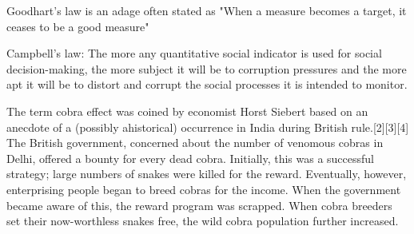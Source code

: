 Goodhart's law is an adage often stated as "When a measure becomes a target, it ceases to be a good measure"

Campbell's law:
The more any quantitative social indicator is used for social decision-making, the more subject it will be to corruption pressures and the more apt it will be to distort and corrupt the social processes it is intended to monitor.

The term cobra effect was coined by economist Horst Siebert based on an anecdote of a (possibly ahistorical) occurrence in India during British rule.[2][3][4] The British government, concerned about the number of venomous cobras in Delhi, offered a bounty for every dead cobra. Initially, this was a successful strategy; large numbers of snakes were killed for the reward. Eventually, however, enterprising people began to breed cobras for the income. When the government became aware of this, the reward program was scrapped. When cobra breeders set their now-worthless snakes free, the wild cobra population further increased.